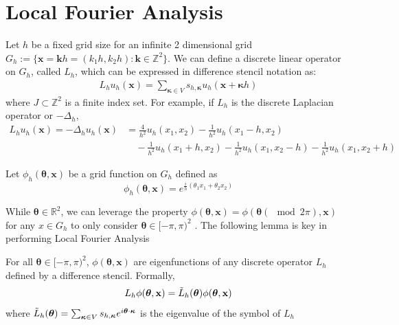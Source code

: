 \documentclass[12pt]{article}
\begin{document}
\section{Local Fourier Analysis}

Let $h$ be a fixed grid size for an infinite 2 dimensional grid $G_h := \{\mathbf{x} = \mathbf{k}h = (k_1h, k_2h): \mathbf{k} \in \mathbb{Z}^2\}$. We can define a discrete linear operator on $G_h$, called $L_h$, which can be expressed in difference stencil notation as:
\begin{align*}
    L_h u_h(\mathbf{x}) = \sum_{\boldsymbol{\kappa} \in V} s_{h, \boldsymbol{\kappa}} u_h(\mathbf{x} + \boldsymbol{\kappa} h)
\end{align*}
where $J \subset \mathbb{Z}^2$ is a finite index set. For example, if $L_h$ is the discrete Laplacian operator or $-\Delta_h$, 
\begin{align*}
    L_h u_h(\mathbf{x}) = -\Delta_h u_h(\mathbf{x}) &= \frac{4}{h^2}u_h(x_1, x_2) - \frac{1}{h^2}u_h(x_1 - h, x_2) \\
    &\quad - \frac{1}{h^2}u_h(x_1 + h, x_2) - \frac{1}{h^2}u_h(x_1, x_2 - h) - \frac{1}{h^2}u_h(x_1, x_2 + h)
\end{align*}

Let $\phi_h(\boldsymbol{\theta}, \mathbf{x})$ be a grid function on $G_h$ defined as
\begin{equation}
    \phi_h(\boldsymbol{\theta}, \mathbf{x}) = e^{\frac{i}{h}\left(\theta_1x_1 + \theta_2x_2\right)} \label{eq:discretefourierbasis}
\end{equation}

While $\boldsymbol{\theta} \in \mathbb{R}^2$, we can leverage the property $\phi(\boldsymbol{\theta}, \mathbf{x}) = \phi(\boldsymbol{\theta} (\mod 2\pi), \mathbf{x})$  for any $x \in G_h$ to only consider $\boldsymbol{\theta} \in [-\pi, \pi)^2$ . The following lemma is key in performing Local Fourier Analysis
\begin{lemma} \label{th:eigendecomposition}
    For all $\boldsymbol{\theta} \in [-\pi, \pi)^2$, $\phi(\boldsymbol{\theta}, \mathbf{x})$ are eigenfunctions of any discrete operator $L_h$ defined by a difference stencil.
    Formally,
    \begin{align*}
        L_h \phi(\boldsymbol{\theta}, \mathbf{x}) = \Tilde{L}_h(\boldsymbol{\theta}) \phi(\boldsymbol{\theta}, \mathbf{x})
    \end{align*}
    where $\Tilde{L}_h(\boldsymbol{\theta}) = \sum_{\boldsymbol{\kappa} \in V} s_{h, \boldsymbol{\kappa}} e^{i\boldsymbol{\theta}\cdot \boldsymbol{\kappa}}$ is the eigenvalue of the symbol of $L_h$
\end{lemma}
\end{document}
